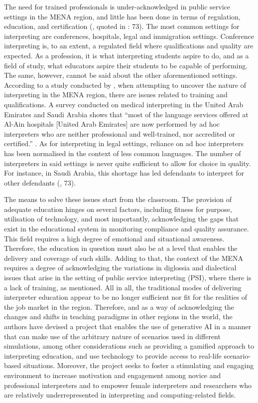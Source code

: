 \documentclass[output=paper]{langscibook}
\begin{document}
The need for trained professionals is under-acknowledged in public service settings in the MENA region, and little has been done in terms of regulation, education, and certification (\citealt{raddawi2015intercultural, taibi2011community}, quoted in \citealt{taibi2021public}: 73). The most common settings for interpreting are conferences, hospitals, legal and immigration settings. Conference interpreting is, to an extent, a regulated field where qualifications and quality are expected. As a profession, it is what interpreting students aspire to do, and as a field of study, what educators aspire their students to be capable of performing. The same, however, cannot be said about the other aforementioned settings. According to a study conducted by \citet[73]{taibi2021public}, when attempting to uncover the nature of interpreting in the MENA region, there are issues related to training and qualifications. A survey conducted on medical interpreting in the United Arab Emirates and Saudi Arabia shows that ``most of the language services offered at Al-Ain hospitals [United Arab Emirates] are now performed by ad hoc interpreters who are neither professional and well-trained, nor accredited or certified.” \citep[73]{taibi2021public}. As for interpreting in legal settings, reliance on ad hoc interpreters has been normalised in the context of less common languages. The number of interpreters in said settings is never quite sufficient to allow for choice in quality. For instance, in Saudi Arabia, this shortage has led defendants to interpret for other defendants (\citealt{taibi2021public}, 73). 

The means to solve these issues start from the classroom. The provision of adequate education hinges on several factors, including fitness for purpose, utilisation of technology, and most importantly, acknowledging the gaps that exist in the educational system in monitoring compliance and quality assurance. This field requires a high degree of emotional and situational awareness. Therefore, the education in question must also be at a level that enables the delivery and coverage of such skills. Adding to that, the context of the MENA requires a degree of acknowledging the variations in diglossia and dialectical issues that arise in the setting of public service interpreting (PSI), where there is a lack of training, as mentioned. All in all, the traditional modes of delivering interpreter education appear to be no longer sufficient nor fit for the realities of the job market in the region. Therefore, and as a way of acknowledging the changes and shifts in teaching paradigms in other regions in the world, the authors have devised a project that enables the use of generative AI in a manner that can make use of the arbitrary nature of scenarios used in different simulations, among other considerations such as providing a gamified approach to interpreting education, and use technology to provide access to real-life scenario-based situations. Moreover, the project seeks to foster a stimulating and engaging environment to increase motivation and engagement among novice and professional interpreters and to empower female interpreters and researchers who are relatively underrepresented in interpreting and computing-related fields.
\end{document}
